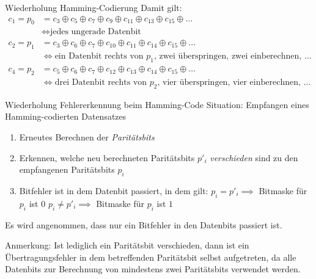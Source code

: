 \begin{defi}{Wiederholung Hamming-Codierung}
    Damit gilt:
    $$
        \begin{aligned}
            c_1 = p_0 & = c_3 \oplus c_5 \oplus c_7 \oplus c_9 \oplus c_{11} \oplus c_{13} \oplus c_{15} \oplus \ldots    \\
                      & \iff \text{jedes ungerade Datenbit}                                                               \\
            c_2 = p_1 & = c_3 \oplus c_6 \oplus c_7 \oplus c_{10} \oplus c_{11} \oplus c_{14} \oplus c_{15} \oplus \ldots \\
                      & \iff \text{ein Datenbit rechts von $p_1$, zwei überspringen, zwei einberechnen, $\ldots$}         \\
            c_4 = p_2 & = c_5 \oplus c_6 \oplus c_7 \oplus c_{12} \oplus c_{13} \oplus c_{14} \oplus c_{15} \oplus \ldots \\
                      & \iff \text{drei Datenbit rechts von $p_2$, vier überspringen, vier einberechnen, $\ldots$}
        \end{aligned}
    $$
\end{defi}

\begin{algo}{Wiederholung Fehlererkennung beim Hamming-Code}
    Situation: Empfangen eines Hamming-codierten Datensatzes

    \begin{enumerate}
        \item Erneutes Berechnen der \emph{Paritätsbits}
        \item Erkennen, welche neu berechneten Paritätsbits $p'_i$ \emph{verschieden} sind zu den empfangenen Paritätsbits $p_i$
        \item Bitfehler ist in dem Datenbit passiert, in dem gilt:
              \subitem $p_i = p'_i \implies$ Bitmaske für $p_i$ ist $0$
              \subitem $p_i \neq p'_i \implies$ Bitmaske für $p_i$ ist $1$
    \end{enumerate}

    Es wird angenommen, dass nur ein Bitfehler in den Datenbits passiert ist.

    Anmerkung: Ist lediglich ein Paritätsbit verschieden, dann ist ein Übertragungsfehler in dem betreffenden Paritätsbit selbst aufgetreten, da alle Datenbits zur Berechnung von mindestens zwei Paritätsbits verwendet werden.
\end{algo}

